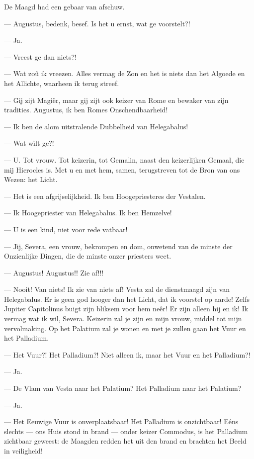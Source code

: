 \documentclass[a4paper, 12pt, oneside, dutch]{article}
\begin{document}
De Maagd had een gebaar van afschuw.

--- Augustus, bedenk, besef. Is het u ernst, wat ge voorstelt?!

--- Ja.

--- Vreest ge dan niets?!

--- Wat zoû ik vreezen. Alles vermag de Zon en het is niets dan het Algoede en het Allichte, waarheen ik terug streef.

--- Gij zijt Magiër, maar gij zijt ook keizer van Rome en bewaker van zijn tradities. Augustus, ik ben Romes Onschendbaarheid!

--- Ik ben de alom uitstralende Dubbelheid van Helegabalus!

--- Wat wìlt ge?!

--- U. Tot vrouw. Tot keizerin, tot Gemalin, naast den keizerlijken Gemaal, die mij Hierocles is. Met u en met hem, samen, terugstreven tot de Bron van ons Wezen: het Licht.

--- Het is een afgrijselijkheid. Ik ben Hoogepriesteres der Vestalen.

--- Ik Hoogepriester van Helegabalus. Ik ben Hemzelve!

--- U is een kind, niet voor rede vatbaar!

--- Jij, Severa, een vrouw, bekrompen en dom, onwetend van de minste der Onzienlijke Dingen, die de minste onzer priesters weet.

--- Augustus! Augustus!! Zie af!!!

--- Nooit! Van niets! Ik zie van niets af! Vesta zal de dienstmaagd zijn van Helegabalus. Er is geen god hooger dan het Licht, dat ik voorstel op aarde! Zelfs Jupiter Capitolinus buigt zijn bliksem voor hem neêr! Er zijn alleen hij en ik! Ik vermag wat ik wil, Severa. Keizerin zal je zijn en mijn vrouw, middel tot mijn vervolmaking. Op het Palatium zal je wonen en met je zullen gaan het Vuur en het Palladium.

--- Het Vuur?! Het Palladium?! Niet alleen ik, maar het Vuur en het Palladium?!

--- Ja.

--- De Vlam van Vesta naar het Palatium? Het Palladium naar het Palatium?

--- Ja.

--- Het Eeuwige Vuur is onverplaatsbaar! Het Palladium is onzichtbaar! Eéns slechts --- ons Huis stond in brand --- onder keizer Commodus, is het Palladium zichtbaar geweest: de Maagden redden het uit den brand en brachten het Beeld in veiligheid!
\end{document}
